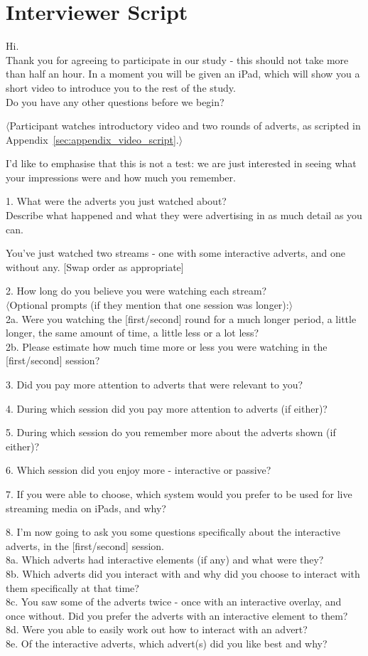\section{Interviewer Script}
	\label{sec:appendix_interview_script}
	Hi.\\
	Thank you for agreeing to participate in our study - this should not take more than half an hour. In a moment you will be given an iPad, which will show you a short video to introduce you to the rest of the study.\\
	Do you have any other questions before we begin?

	$\langle$Participant watches introductory video and two rounds of adverts, as scripted in Appendix~\ref{sec:appendix_video_script}.$\rangle$

	I'd like to emphasise that this is not a test: we are just interested in seeing what your impressions were and how much you remember.

	1. What were the adverts you just watched about? \\Describe what happened and what they were advertising in as much detail as you can.

	You've just watched two streams - one with some interactive adverts, and one without any. [Swap order as appropriate]

	2. How long do you believe you were watching each stream?\\
	$\langle$Optional prompts (if they mention that one session was longer):$\rangle$\\
	2a. Were you watching the [first/second] round for a much longer period, a little longer, the same amount of time, a little less or a lot less?\\
	2b. Please estimate how much time more or less you were watching in the [first/second] session?

	3. Did you pay more attention to adverts that were relevant to you?

	4. During which session did you pay more attention to adverts (if either)?

	5. During which session do you remember more about the adverts shown (if either)?

	6. Which session did you enjoy more - interactive or passive?

	7. If you were able to choose, which system would you prefer to be used for live streaming media on iPads, and why?


	8. I'm now going to ask you some questions specifically about the interactive adverts, in the [first/second] session.\\
	8a. Which adverts had interactive elements (if any) and what were they?\\
	8b. Which adverts did you interact with and why did you choose to interact with them specifically at that time?\\
	8c. You saw some of the adverts twice - once with an interactive overlay, and once without. Did you prefer the adverts with an interactive element to them?\\
	8d. Were you able to easily work out how to interact with an advert?\\
	8e. Of the interactive adverts, which advert(s) did you like best and why?

